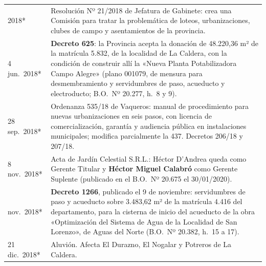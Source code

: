 \begin{longtable}{@{}p{2.7cm}p{10.3cm}@{}}
2018* & Resolución Nº 21/2018 de Jefatura de Gabinete: crea una Comisión para tratar la problemática de loteos, urbanizaciones, clubes de campo y asentamientos de la provincia. \\
4 jun.\ 2018* & \textbf{Decreto 625}: la Provincia acepta la donación de 48.220,36 m² de la matrícula 5.832, de la localidad de La Caldera, con la condición de construir allí la «Nueva Planta Potabilizadora Campo Alegre» (plano 001079, de mensura para desmembramiento y servidumbres de paso, acueducto y electroducto; B.O.\ Nº 20.277, h.\ 8 y 9). \\
28 sep.\ 2018* & Ordenanza 535/18 de Vaqueros: manual de procedimiento para nuevas urbanizaciones en seis pasos, con licencia de comercialización, garantía y audiencia pública en instalaciones municipales; modifica parcialmente la 437. Decretos 206/18 y 207/18. \\
8 nov.\ 2018* & Acta de Jardín Celestial S.R.L.: Héctor D'Andrea\index{D'Andrea, Héctor} queda como Gerente Titular y \textbf{Héctor Miguel Calabró\index{Calabró, Héctor Miguel}} como Gerente Suplente (publicado en el B.O.\ Nº 20.675 el 30/01/2020). \\
nov.\ 2018* & \textbf{Decreto 1266}, publicado el 9 de noviembre: servidumbres de paso y acueducto sobre 3.483,62 m² de la matrícula 4.416 del departamento, para la cisterna de inicio del acueducto de la obra «Optimización del Sistema de Agua de la Localidad de San Lorenzo», de Aguas del Norte (B.O.\ Nº 20.382, h.\ 15 a 17). \\
21 dic.\ 2018* & Aluvión. Afecta El Durazno, El Nogalar y Potreros de La Caldera. \\

\end{longtable}
